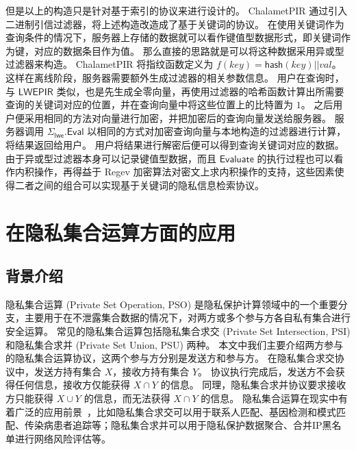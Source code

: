 但是以上的构造只是针对基于索引的协议来进行设计的。
ChalametPIR 通过引入二进制引信过滤器，将上述构造改造成了基于关键词的协议。
在使用关键词作为查询条件的情况下，服务器上存储的数据就可以看作键值型数据形式，即关键词作为键，对应的数据条目作为值。
那么直接的思路就是可以将这种数据采用异或型过滤器来构造。
ChalametPIR 将指纹函数定义为 $f(key) = \mathsf{hash}(key) || val$。
这样在离线阶段，服务器需要额外生成过滤器的相关参数信息。
用户在查询时，与 $\mathsf{LWEPIR}$ 类似，也是先生成全零向量，再使用过滤器的哈希函数计算出所需要查询的关键词对应的位置，并在查询向量中将这些位置上的比特置为 $1$。
之后用户便采用相同的方法对向量进行加密，并把加密后的查询向量发送给服务器。
服务器调用 $\Sigma_{\mathsf{lwe}}.\mathsf{Eval}$ 以相同的方式对加密查询向量与本地构造的过滤器进行计算，将结果返回给用户。
用户将结果进行解密后便可以得到查询关键词对应的数据。
由于异或型过滤器本身可以记录键值型数据，而且 $\mathsf{Evaluate}$ 的执行过程也可以看作内积操作，再得益于 Regev 加密算法对密文上求内积操作的支持，这些因素使得二者之间的组合可以实现基于关键词的隐私信息检索协议。


\section{在隐私集合运算方面的应用}

\subsection{背景介绍}

隐私集合运算 (Private Set Operation, PSO) 是隐私保护计算领域中的一个重要分支，主要用于在不泄露集合数据的情况下，对两方或多个参与方各自私有集合进行安全运算。
常见的隐私集合运算包括隐私集合求交 (Private Set Intersection, PSI) 和隐私集合求并 (Private Set Union, PSU) 两种。
本文中我们主要介绍两方参与的隐私集合运算协议，这两个参与方分别是发送方和参与方。
在隐私集合求交协议中，发送方持有集合 $X$，接收方持有集合 $Y$。
协议执行完成后，发送方不会获得任何信息，接收方仅能获得 $X\cap Y$ 的信息。
同理，隐私集合求并协议要求接收方只能获得 $X\cup Y$ 的信息，而无法获得 $X\cap Y$ 的信息。
隐私集合运算在现实中有着广泛的应用前景~\cite{zhang2024survey}，比如隐私集合求交可以用于联系人匹配、基因检测和模式匹配、传染病患者追踪等；隐私集合求并可以用于隐私保护数据聚合、合并IP黑名单进行网络风险评估等。

